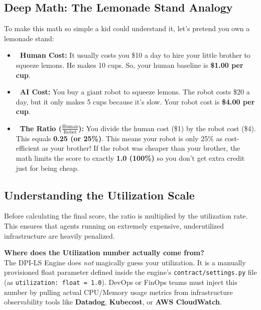 \documentclass[11pt,a4paper]{article}
\begin{document}
\subsection{Deep Math: The Lemonade Stand Analogy}

\begin{tcolorbox}[enhanced, colback=dpicloud!10!white, colframe=dpicloud, title={\textbf{\faLightbulb\ The Lemonade Stand Analogy}}, fonttitle=\bfseries\large, boxrule=1pt, arc=2mm, drop shadow]
To make this math so simple a kid could understand it, let's pretend you own a lemonade stand:

\vspace{0.2cm}
\begin{itemize}
    \item \textbf{\color{dpiblue}\faUserTie\ Human Cost:} It usually costs you \$10 a day to hire your little brother to squeeze lemons. He makes 10 cups. So, your human baseline is \textbf{\$1.00 per cup}.
    \item \textbf{\color{dpigreen}\faRobot\ AI Cost:} You buy a giant robot to squeeze lemons. The robot costs \$20 a day, but it only makes 5 cups because it's slow. Your robot cost is \textbf{\$4.00 per cup}.
    \item \textbf{\color{dpired}\faBalanceScale\ The Ratio ($\frac{\text{Human}}{\text{Robot}}$):} You divide the human cost (\$1) by the robot cost (\$4). This equals \textbf{0.25 (or 25\%)}. This means your robot is only 25\% as cost-efficient as your brother! If the robot was cheaper than your brother, the math limits the score to exactly \textbf{1.0 (100\%)} so you don't get extra credit just for being cheap.
\end{itemize}
\end{tcolorbox}

\subsection{Understanding the Utilization Scale}

Before calculating the final score, the ratio is multiplied by the utilization rate. This ensures that agents running on extremely expensive, underutilized infrastructure are heavily penalized.

\begin{dpinote}
\textbf{Where does the Utilization number actually come from?} \\
The DPI-LS Engine does \textit{not} magically guess your utilization. It is a manually provisioned float parameter defined inside the engine's \texttt{contract/settings.py} file (as \texttt{utilization: float = 1.0}). DevOps or FinOps teams must inject this number by pulling actual CPU/Memory usage metrics from infrastructure observability tools like \textbf{Datadog}, \textbf{Kubecost}, or \textbf{AWS CloudWatch}.
\end{dpinote}
\end{document}
